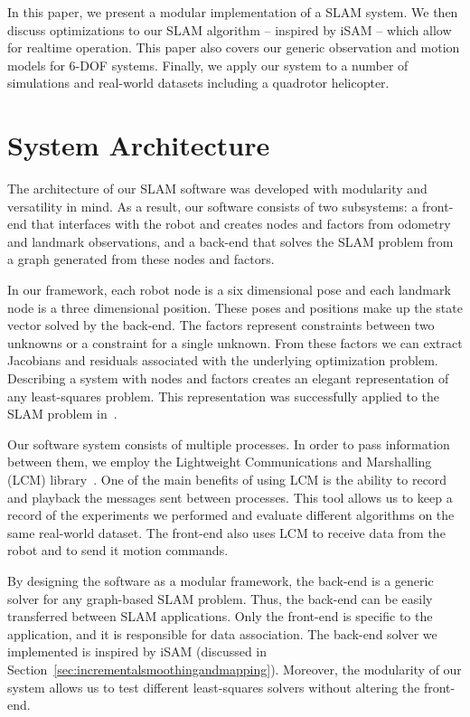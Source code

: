 \documentclass[conference]{IEEEtran}
\begin{document}
In this paper, we present a modular implementation of a \ac{SLAM} system. We then discuss
optimizations to our SLAM algorithm -- inspired by iSAM -- which allow for realtime
operation. This paper also covers our generic observation and motion models for 6-\ac{DOF}
systems. Finally, we apply our system to a number of simulations and real-world datasets
including a quadrotor helicopter.



\section{System Architecture}
\label{sec:systemarchitecture}


The architecture of our \ac{SLAM} software was developed with modularity and versatility
in mind.  As a result, our software consists of two subsystems: a
front-end that interfaces with the robot and creates nodes and factors from
odometry and landmark observations, and a back-end that solves the \ac{SLAM} problem from
a graph generated from these nodes and factors.

In our framework, each robot node is a six dimensional pose and each landmark node is a
three dimensional position. These poses and positions make up the state vector solved by
the back-end. The factors represent constraints between two unknowns or a constraint for a
single unknown. From these factors we can extract Jacobians and residuals associated with
the underlying optimization problem. Describing a system with nodes and factors creates
an elegant representation of any least-squares problem. This representation was
successfully applied to the \ac{SLAM} problem in~\cite{dellaert2005square}.


Our software system consists of multiple processes. In order to pass information between
them, we employ the Lightweight Communications and Marshalling (LCM)
library~\cite{huang2010}. One of the main benefits of using LCM is the ability to record
and playback the messages sent between processes. This tool allows us to keep a record of
the experiments we performed and evaluate different algorithms on the same
real-world dataset. The front-end also uses LCM to receive data from the robot and to send
it motion commands.

By designing the software as a modular framework, the back-end is a generic solver for any
graph-based \ac{SLAM} problem. Thus, the back-end can be easily transferred between
\ac{SLAM} applications. Only the front-end is specific to the application, and it is
responsible for data association. The back-end solver we implemented is inspired by iSAM
(discussed in Section~\ref{sec:incrementalsmoothingandmapping}). Moreover, the modularity
of our system allows us to test different least-squares solvers without altering the
front-end.
\end{document}
